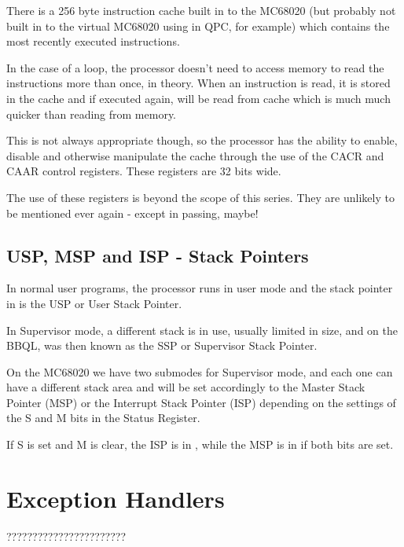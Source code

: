 There is a 256 byte instruction cache built in to the MC68020 (but probably not built in to the virtual MC68020 using in QPC, for example) which contains the most recently executed instructions.

In the case of a loop, the processor doesn't need to access memory to read the instructions more than once, in theory. When an instruction is read, it is stored in the cache and if executed again, will be read from cache which is much much quicker than reading from memory.

This is not always appropriate though, so the processor has the ability to enable, disable and otherwise manipulate the cache through the use of the CACR and CAAR control registers. These registers are 32 bits wide.

The use of these registers is beyond the scope of this series. They are unlikely to be mentioned ever again - except in passing, maybe!

\subsection{USP, MSP and ISP - Stack Pointers}

In normal user programs, the processor runs in user mode and the stack pointer in  is the USP or User Stack Pointer.

In Supervisor mode, a different stack is in use, usually limited in size, and on the BBQL,  was then known as the SSP or Supervisor Stack Pointer.

On the MC68020 we have two submodes for Supervisor mode, and each one can have a different stack area and  will be set accordingly to the Master Stack Pointer (MSP) or the Interrupt Stack Pointer (ISP) depending on the settings of the S and M bits in the Status Register.

If S is set and M is clear, the ISP is in , while the MSP is in  if both bits are set.


\section{Exception Handlers}

???????????????????????